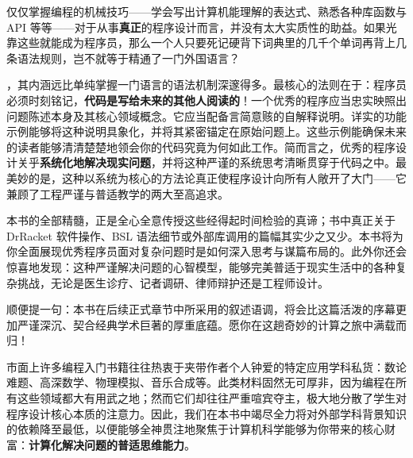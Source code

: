 仅仅掌握编程的机械技巧——学会写出计算机能理解的表达式、熟悉各种库函数与 API 等等——对于从事\textbf{真正}的程序设计而言，并没有太大实质性的助益。如果光靠这些就能成为程序员，那么一个人只要死记硬背下词典里的几千个单词再背上几条语法规则，岂不就等于精通了一门外国语言？

，其内涵远比单纯掌握一门语言的语法机制深邃得多。最核心的法则在于：程序员必须时刻铭记，\textbf{代码是写给未来的其他人阅读的}！一个优秀的程序应当忠实映照出问题陈述本身及其核心领域概念。它应当配备言简意赅的自解释说明。详实的功能示例能够将这种说明具象化，并将其紧密锚定在原始问题上。这些示例能确保未来的读者能够清清楚楚地领会你的代码究竟为何如此工作。简而言之，优秀的程序设计关乎\textbf{系统化地解决现实问题}，并将这种严谨的系统思考清晰贯穿于代码之中。最美妙的是，这种以系统为核心的方法论真正使程序设计向所有人敞开了大门——它兼顾了工程严谨与普适教学的两大至高追求。

本书的全部精髓，正是全心全意传授这些经得起时间检验的真谛；书中真正关于 DrRacket 软件操作、BSL 语法细节或外部库调用的篇幅其实少之又少。本书将为你全面展现优秀程序员面对复杂问题时是如何深入思考与谋篇布局的。此外你还会惊喜地发现：这种严谨解决问题的心智模型，能够完美普适于现实生活中的各种复杂挑战，无论是医生诊疗、记者调研、律师辩护还是工程师设计。

顺便提一句：本书在后续正式章节中所采用的叙述语调，将会比这篇活泼的序幕更加严谨深沉、契合经典学术巨著的厚重底蕴。愿你在这趟奇妙的计算之旅中满载而归！

\begin{notebox}[关于本书不涵盖什么的说明]
市面上许多编程入门书籍往往热衷于夹带作者个人钟爱的特定应用学科私货：数论难题、高深数学、物理模拟、音乐合成等。此类材料固然无可厚非，因为编程在所有这些领域都大有用武之地；然而它们却往往严重喧宾夺主，极大地分散了学生对程序设计核心本质的注意力。因此，我们在本书中竭尽全力将对外部学科背景知识的依赖降至最低，以便能够全神贯注地聚焦于计算机科学能够为你带来的核心财富：\textbf{计算化解决问题的普适思维能力}。
\end{notebox}
